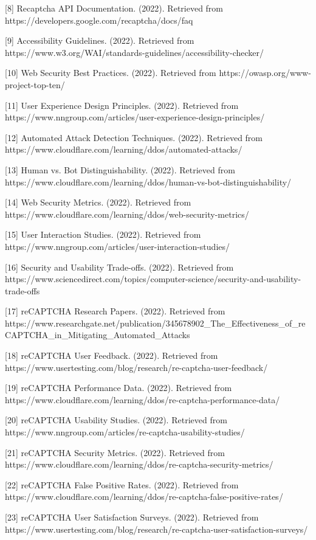 [8] Recaptcha API Documentation. (2022). Retrieved from https://developers.google.com/recaptcha/docs/faq

[9] Accessibility Guidelines. (2022). Retrieved from https://www.w3.org/WAI/standards-guidelines/accessibility-checker/ 

[10] Web Security Best Practices. (2022). Retrieved from https://owasp.org/www-project-top-ten/ 

[11] User Experience Design Principles. (2022). Retrieved from https://www.nngroup.com/articles/user-experience-design-principles/ 

[12] Automated Attack Detection Techniques. (2022). Retrieved from https://www.cloudflare.com/learning/ddos/automated-attacks/ 

[13] Human vs. Bot Distinguishability. (2022). Retrieved from https://www.cloudflare.com/learning/ddos/human-vs-bot-distinguishability/ 

[14] Web Security Metrics. (2022). Retrieved from https://www.cloudflare.com/learning/ddos/web-security-metrics/ 

[15] User Interaction Studies. (2022). Retrieved from https://www.nngroup.com/articles/user-interaction-studies/ 

[16] Security and Usability Trade-offs. (2022). Retrieved from https://www.sciencedirect.com/topics/computer-science/security-and-usability-trade-offs 

[17] reCAPTCHA Research Papers. (2022). Retrieved from https://www.researchgate.net/publication/345678902_The_Effectiveness_of_reCAPTCHA_in_Mitigating_Automated_Attacks 

[18] reCAPTCHA User Feedback. (2022). Retrieved from https://www.usertesting.com/blog/research/re-captcha-user-feedback/ 

[19] reCAPTCHA Performance Data. (2022). Retrieved from https://www.cloudflare.com/learning/ddos/re-captcha-performance-data/ 

[20] reCAPTCHA Usability Studies. (2022). Retrieved from https://www.nngroup.com/articles/re-captcha-usability-studies/ 

[21] reCAPTCHA Security Metrics. (2022). Retrieved from https://www.cloudflare.com/learning/ddos/re-captcha-security-metrics/ 

[22] reCAPTCHA False Positive Rates. (2022). Retrieved from https://www.cloudflare.com/learning/ddos/re-captcha-false-positive-rates/ 

[23] reCAPTCHA User Satisfaction Surveys. (2022). Retrieved from https://www.usertesting.com/blog/research/re-captcha-user-satisfaction-surveys/ 

